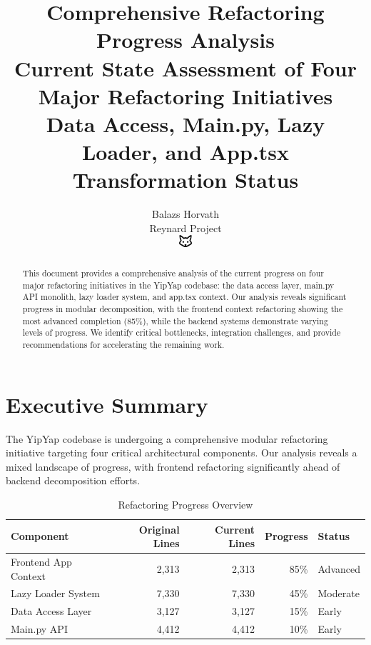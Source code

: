 \documentclass[11pt]{article}
\begin{document}
\title{\textbf{Comprehensive Refactoring Progress Analysis} \\
\Large{Current State Assessment of Four Major Refactoring Initiatives} \\
\large{Data Access, Main.py, Lazy Loader, and App.tsx Transformation Status}}

\author{Balazs Horvath\\
Reynard Project\\
\includegraphics[width=0.5cm]{../../shared-assets/favicon.pdf}}

\maketitle

\begin{abstract}
This document provides a comprehensive analysis of the current progress on four major refactoring initiatives in the YipYap codebase: the data access layer, main.py API monolith, lazy loader system, and app.tsx context. Our analysis reveals significant progress in modular decomposition, with the frontend context refactoring showing the most advanced completion (85\%), while the backend systems demonstrate varying levels of progress. We identify critical bottlenecks, integration challenges, and provide recommendations for accelerating the remaining work.
\end{abstract}

\tableofcontents
\newpage

\section{Executive Summary}

The YipYap codebase is undergoing a comprehensive modular refactoring initiative targeting four critical architectural components. Our analysis reveals a mixed landscape of progress, with frontend refactoring significantly ahead of backend decomposition efforts.

\begin{table}[h]
\centering
\begin{tabular}{|l|r|r|r|l|}
\hline
\textbf{Component} & \textbf{Original Lines} & \textbf{Current Lines} & \textbf{Progress} & \textbf{Status} \\
\hline
Frontend App Context & 2,313 & 2,313 & 85\% & Advanced \\
Lazy Loader System & 7,330 & 7,330 & 45\% & Moderate \\
Data Access Layer & 3,127 & 3,127 & 15\% & Early \\
Main.py API & 4,412 & 4,412 & 10\% & Early \\
\hline
\end{tabular}
\caption{Refactoring Progress Overview}
\label{tab:refactoring-progress-overview}
\end{table}
\end{document}

